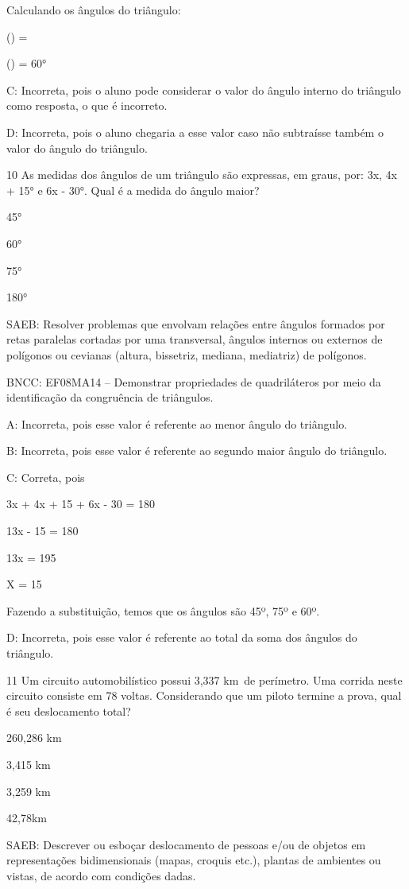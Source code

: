 {Calculando os ângulos do triângulo:

() =

() = 60°

C: Incorreta, pois o aluno pode considerar o valor do ângulo interno do
triângulo como resposta, o que é incorreto.

D: Incorreta, pois o aluno chegaria a esse valor caso não subtraísse
também o valor do ângulo do triângulo.

\num{10} As medidas dos ângulos de um triângulo são expressas, em graus, por:
3x, 4x + 15° e 6x - 30°. Qual é a medida do ângulo maior?
\item 45°
\item 60°
\item 75°
\item 180°

SAEB: Resolver problemas que envolvam relações entre ângulos formados
por retas paralelas cortadas por uma transversal, ângulos internos ou
externos de polígonos ou cevianas (altura, bissetriz, mediana,
mediatriz) de polígonos.

BNCC: EF08MA14 -- Demonstrar propriedades de quadriláteros por meio da
identificação da congruência de triângulos.

A: Incorreta, pois esse valor é referente ao menor ângulo do triângulo.

B: Incorreta, pois esse valor é referente ao segundo maior ângulo do
triângulo.

C: Correta, pois

3x + 4x + 15 + 6x - 30 = 180

13x - 15 = 180

13x = 195

X = 15

Fazendo a substituição, temos que os ângulos são 45º, 75º e 60º.

D: Incorreta, pois esse valor é referente ao total da soma dos ângulos
do triângulo.

\num{11} Um circuito automobilístico possui 3,337 km~de perímetro. Uma
corrida neste circuito consiste em 78 voltas. Considerando que um piloto
termine a prova, qual é seu deslocamento total?
\item 260,286 km
\item 3,415 km
\item 3,259 km
\item 42,78km

SAEB: Descrever ou esboçar deslocamento de pessoas e/ou de objetos em
representações bidimensionais (mapas, croquis etc.), plantas de
ambientes ou vistas, de acordo com condições dadas.

}
